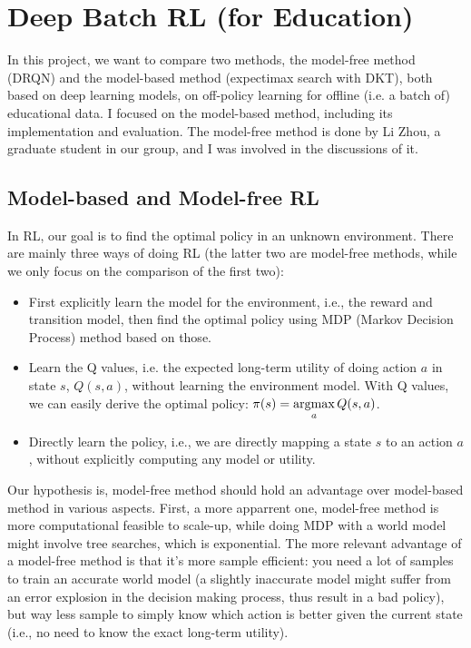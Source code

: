 \section{Deep Batch RL (for Education)}
\label{sec:deepRL}

In this project, we want to compare two methods, the model-free method (DRQN) and the model-based method (expectimax search with DKT), both based on deep learning models, on off-policy learning for offline (i.e. a batch of) educational data. I focused on the model-based method, including its implementation and evaluation. The model-free method is done by Li Zhou, a graduate student in our group, and I was involved in the discussions of it.

\subsection{Model-based and Model-free RL}
\label{subsec:model-free}

In RL, our goal is to find the optimal policy in an unknown environment. There are mainly three ways of doing RL (the latter two are model-free methods, while we only focus on the comparison of the first two):

\begin{itemize}
\item First explicitly learn the model for the environment, i.e., the reward and transition model, then find the optimal policy using MDP (Markov Decision Process) method based on those.
\item Learn the Q values, i.e. the expected long-term utility of doing action $a$ in state $s$, $Q(s, a)$, without learning the environment model. With Q values, we can easily derive the optimal policy: $\pi(s)=\argmax\limits_a Q(s, a)$.
\item Directly learn the policy, i.e., we are directly mapping a state $s$ to an action $a$, without explicitly computing any model or utility. 
\end{itemize}

Our hypothesis is, model-free method should hold an advantage over model-based method in various aspects. First, a more apparrent one, model-free method is more computational feasible to scale-up, while doing MDP with a world model might involve tree searches, which is exponential. The more relevant advantage of a model-free method is that it's more sample efficient: you need a lot of samples to train an accurate world model (a slightly inaccurate model might suffer from an error explosion in the decision making process, thus result in a bad policy), but way less sample to simply know which action is better given the current state (i.e., no need to know the exact long-term utility).

